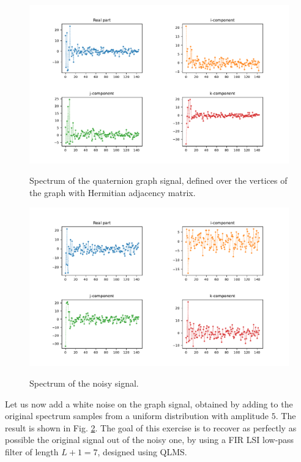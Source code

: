 \begin{figure}
    \centering
    \caption{Spectrum of the quaternion graph signal, defined over the vertices of the graph with Hermitian adjacency matrix.}
    \includegraphics[width=\linewidth]{Figures/uk_example/uk_spectrum_hermitian.pdf}
    \floatsource
    \label{fig:uk_qgsp_spectrum_hermitian}
\end{figure}

\begin{figure}
    \centering
    \caption{Spectrum of the noisy signal.}
    \includegraphics[width=\linewidth]{Figures/uk_example/uk_spectrum_noisy.pdf}
    \floatsource
    \label{fig:uk_spectrum_noisy}
\end{figure}

Let us now add a white noise on the graph signal, obtained by adding to the original spectrum samples from a uniform distribution with amplitude $5$. The result is shown in Fig. \ref{fig:uk_spectrum_noisy}. The goal of this exercise is to recover as perfectly as possible the original signal out of the noisy one, by using a FIR LSI low-pass filter of length $L+1 = 7$, designed using QLMS.

